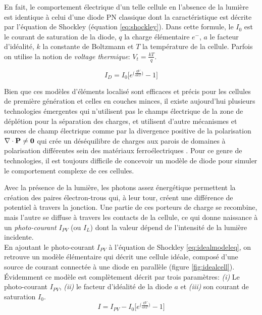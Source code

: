 En fait, le comportement électrique d'un telle cellule en l'absence de la lumière est identique à celui d'une diode PN classique dont la caractéristique est décrite par l'équation de Shockley (équation \ref{eq:shockley}). Dans cette formule, le $I_0$ est le courant de saturation de la diode, $q$ la charge élémentaire $e^{-}$, $a$ le facteur d'idéalité, $k$ la constante de Boltzmann et $T$ la température de la cellule. Parfois on utilise la notion de \textit{voltage thermique}: $V_t = \frac{kT}{q}$.

\begin{equation}
\label{eq:shockley}
  I_D = I_0 \bigg[e^{\big(\frac{qV}{akT}\big)} - 1\bigg]
\end{equation}

Bien que ces modèles d'éléments localisé sont efficaces et précis pour les cellules de première génération et celles en couches minces, il existe aujourd'hui plusieurs technologies émergentes qui n'utilisent pas le champs électrique de la zone de déplétion pour la séparation des charges, et utilisent d'autre mécanismes et sources de champ électrique comme par la divergence positive de la polarisation $\nabla \cdot \bf{P} \neq 0$ qui crée un déséquilibre de charges aux parois de domaines à polarisation différentes sein des matériaux ferroélectriques \cite{Huang2010}. Pour ce genre de technologies, il est toujours difficile de concevoir un modèle de diode pour simuler le comportement complexe de ces cellules.


Avec la présence de la lumière, les photons assez énergétique permettent la création des paires électron-trous qui, à leur tour, créent une différence de potentiel à travers la jonction. Une partie de ces porteurs de charge se recombine, mais l'autre se diffuse à travers les contacts de la cellule, ce qui donne naissance à un \textit{photo-courant} $I_{PV}$ (ou $I_L$) dont la valeur dépend de l'intensité de la lumière incidente.\\
En ajoutant le photo-courant $I_{PV}$ à l'équation de Shockley \ref{eq:idealmodeleq}, on retrouve un modèle élémentaire qui décrit une cellule idéale, composé d'une source de courant connectée à une diode en parallèle (figure \ref{fig:idealcell}). Évidemment ce modèle est complètement décrit par trois paramètres: \textit{(i)} Le photo-courant $I_{PV}$, \textit{(ii)} le facteur d'idéalité de la diode $a$ et \textit{(iii)} son courant de saturation $I_0$. 
\begin{equation}
\label{eq:idealmodeleq}
  I = I_{PV} - I_0 \bigg[e^{\big(\frac{qV}{akT}\big)} - 1\bigg]
\end{equation}

